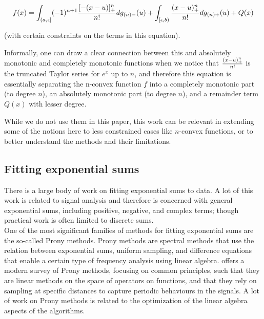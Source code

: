 \documentclass[12pt,a4paper]{article}
\begin{document}
\begin{equation}
f(x) = \int_{(a,\epsilon]} (-1)^{n+1} {{[-(x-u)]^n_{+}} \over {n!}} dg_{(n)-}(u) + \int_{[\epsilon,b)} {{(x-u)^n_{+}} \over {n!}} dg_{(n)+}(u) + Q(x)
\end{equation}

\noindent (with certain constraints on the terms in this equation).

Informally, one can draw a clear connection between this and absolutely monotonic and completely monotonic functions when we notice that ${{(x-u)^n_{+}} \over {n!}}$ is the truncated Taylor series for $e^x$ up to $n$, and therefore this equation is essentially separating the n-convex function $f$ into a completely monotonic part (to degree $n$), an absolutely monotonic part (to degree $n$), and a remainder term $Q(x)$ with lesser degree.

While we do not use them in this paper, this work can be relevant in extending some of the notions here to less constrained cases like $n$-convex functions, or to better understand the methods and their limitations.\\

\subsection{Fitting exponential sums}
\label{exponential_sums}

There is a large body of work on fitting exponential sums to data. A lot of this work is related to signal analysis and therefore is concerned with general exponential sums, including positive, negative, and complex terms; though practical work is often limited to discrete sums.\\ 

One of the most significant families of methods for fitting exponential sums are the so-called Prony methods. Prony methods are spectral methods that use the relation between exponential sums, uniform sampling, and difference equations that enable a certain type of frequency analysis using linear algebra. \cite{2021_keller_prony_methods} offers a modern survey of Prony methods, focusing on common principles, such that they are linear methods on the space of operators on functions, and that they rely on sampling at specific distances to capture periodic behaviours in the signals. A lot of work on Prony methods is related to the optimization of the linear algebra aspects of the algorithms.
\end{document}
